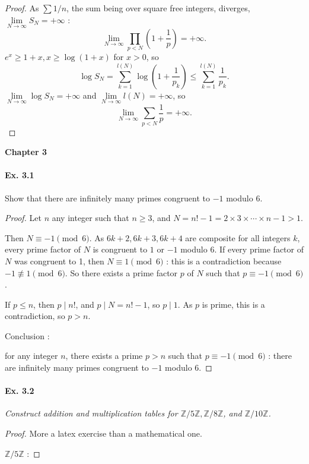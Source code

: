 \documentclass[11pt,a4paper]{article}
\newcommand{\Z}{\mathbb{Z}}
\begin{document}
{\begin{proof}
As $\sum 1/n$, the sum being over square free integers, diverges, $\lim\limits_{N\to \infty} S_N = + \infty$ :
$$\lim_{N \to \infty} \prod_{p<N} \left(1+\frac{1}{p}\right) = +\infty.$$
 $e^x \geq 1+x, x \geq \log (1+x)$ for $x>0$, so
$$\log S_N = \sum_{k=1}^{l(N)} \log\left(1+\frac{1}{p_k}\right) \leq \sum_{k=1}^{l(N)} \frac{1}{p_k}.$$
$\lim\limits_{N\to \infty} \log S_N = +\infty$ and $\lim\limits_{N\to \infty} l(N) = +\infty$, so
$$\lim_{N\to \infty} \sum_{p<N} \frac{1}{p} = +\infty.$$
\end{proof}


{\large \bf Chapter 3}

{\it \paragraph{Ex. 3.1}
Show that there are infinitely many primes congruent to $-1$ modulo $6$.
}

\begin{proof}
Let $n$ any integer such that $n\geq 3$, and $N = n! -1 =   2 \times 3 \times\cdots\times n - 1 >1$. 

Then $N \equiv -1 \pmod 6$. As $6k +2, 6k +3, 6k +4$ are composite for all integers $k$, every prime factor of $N$ is congruent to $1$ or $-1$ modulo $6$.  If every prime factor of $N$ was congruent to 1, then $N \equiv 1 \pmod 6$ : this is a contradiction because $-1 \not \equiv 1 \pmod 6$.  So there exists a prime factor $p$ of $N$ such that $p\equiv -1 \pmod 6$.

If $p\leq n$, then $p \mid n!$, and $p \mid N = n!-1$, so $p \mid 1$. As $p$ is prime, this is a contradiction, so $p>n$. 

Conclusion :

 for any integer $n$, there exists a prime $p >n$ such that $p \equiv -1 \pmod 6$ : there are infinitely many primes congruent to $-1$ modulo $6$.
\end{proof}

\paragraph{Ex. 3.2}

{\it Construct addition and multiplication tables for $\Z/5\Z, \Z/8\Z$, and $\Z/10\Z$.
}

\begin{proof}
More a latex exercise than a mathematical one.

\medskip

$\Z/5\Z$ :


\end{proof}}
\end{document}
